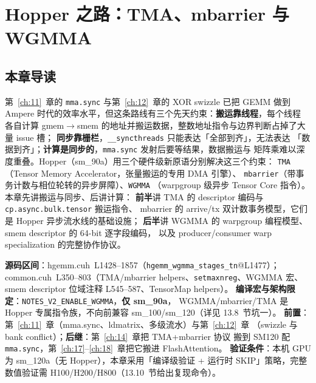 \chapter{Hopper 之路：TMA、mbarrier 与 WGMMA}\label{ch:13}

\section{本章导读}

第~\ref{ch:11}~章的 \texttt{mma.sync} 与第~\ref{ch:12}~章的 XOR swizzle 已把 GEMM 做到
Ampere 时代的效率水平，但这条路线有三个先天约束：\textbf{搬运靠线程}，每个线程
各自计算 gmem$\to$smem 的地址并搬运数据，整数地址指令与边界判断占掉了大量 issue 槽；
\textbf{同步靠栅栏}，\texttt{\_\allowbreak{}\_\allowbreak{}syncthreads} 只能表达「全部到齐」，无法表达
「数据到齐」；\textbf{计算是同步的}，\texttt{mma.sync} 发射后要等结果，数据搬运与
矩阵乘难以深度重叠。Hopper（sm\_90a）用三个硬件级新原语分别解决这三个约束：
\texttt{TMA}（Tensor Memory Accelerator，张量搬运的专用 DMA 引擎）、
\texttt{mbarrier}（带事务计数与相位轮转的异步屏障）、\texttt{WGMMA}
（warpgroup 级异步 Tensor Core 指令）。本章先讲搬运与同步、后讲计算：
\textbf{前半}讲 TMA 的 descriptor 编码与 \texttt{cp.\allowbreak{}async.\allowbreak{}bulk.\allowbreak{}tensor} 搬运指令、
mbarrier 的 arrive/tx 双计数事务模型，它们是 Hopper 异步流水线的基础设施；
\textbf{后半}讲 WGMMA 的 warpgroup 编程模型、smem descriptor 的 64-bit 逐字段编码，
以及 producer/consumer warp specialization 的完整协作协议。

\textbf{源码区间}：hgemm.cuh~L1428--1857（\texttt{hgemm\_\allowbreak{}wgmma\_\allowbreak{}stages\_\allowbreak{}tn}@L1477）；
common.cuh~L350--803（TMA/mbarrier helpers、\texttt{setmaxnreg}、WGMMA 宏、
smem descriptor 位域注释 L545--587、TensorMap helpers）。
\textbf{编译宏与架构限定}：\texttt{NOTES\_\allowbreak{}V2\_\allowbreak{}ENABLE\_\allowbreak{}WGMMA}，\textbf{仅 sm\_90a}，
WGMMA/mbarrier/TMA 是 Hopper 专属指令族，不向前兼容 sm\_100/sm\_120（详见 13.8~节坑一）。
\textbf{前置}：第~\ref{ch:11}~章（mma.sync、ldmatrix、多级流水）与第~\ref{ch:12}~章
（swizzle 与 bank conflict）；\textbf{后继}：第~\ref{ch:14}~章把 TMA+mbarrier 协议
搬到 SM120 配 \texttt{mma.sync}，第~\ref{ch:17}--\ref{ch:18}~章把它搬进 FlashAttention。
\textbf{验证条件}：本机 GPU 为 sm\_120a（无 Hopper），本章采用「编译级验证 + 运行时
SKIP」策略，完整数值验证需 H100/H200/H800（13.10~节给出复现命令）。

